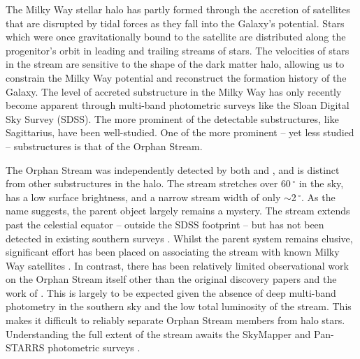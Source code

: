 \documentclass[10pt,apjl]{emulateapj}
\begin{document}
The Milky Way stellar halo has partly formed through the accretion of satellites that are disrupted by tidal forces as they fall into the Galaxy's potential. Stars which were once gravitationally bound to the satellite are distributed along the progenitor's orbit in leading and trailing streams of stars. The velocities of stars in the stream are sensitive to the shape of the dark matter halo, allowing us to constrain the Milky Way potential and reconstruct the formation history of the Galaxy. The level of accreted substructure in the Milky Way has only recently become apparent through multi-band photometric surveys like the Sloan Digital Sky Survey (SDSS). The more prominent of the detectable substructures, like Sagittarius, have been well-studied. One of the more prominent \--- yet less studied \--- substructures is that of the Orphan Stream. 


The Orphan Stream was independently detected by both \citet{Grillmair_2006} and \citet{Belokurov_et-al_2006}, and is distinct from other substructures in the halo. The stream stretches over $60\,^\circ$ in the sky, has a low surface brightness, and a narrow stream width of only $\sim$2\,$^\circ$.  As the name suggests, the parent object largely remains a mystery. The stream extends past the celestial equator \--- outside the SDSS footprint \--- but has not been detected in existing southern surveys \citep{Newberg_et-al_2010}. Whilst the parent system remains elusive, significant effort has been placed on associating the stream with known Milky Way satellites \citep{Zucker_et-al_2006, Fellhaur_et-al_2007,Jin_Lynden_Bell_2007,Sales_et-al_2008}. In contrast, there has been relatively limited observational work on the Orphan Stream itself other than the original discovery papers \citep{Grillmair_2006, Belokurov_et-al_2006, Belokurov_et-al_2007} and the work of \citet{Newberg_et-al_2010}. This is largely to be expected given the absence of deep multi-band photometry in the southern sky and the low total luminosity of the stream. This makes it difficult to reliably separate Orphan Stream members from halo stars. Understanding the full extent of the stream awaits the SkyMapper and Pan-STARRS photometric surveys \citep{Keller_et-al_2007, Hodapp_et-al_2004}.
\end{document}
